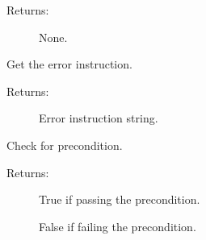 \documentclass[letterpaper,10pt,english]{sphinxmanual}
\begin{document}
\begin{fulllineitems}
\begin{fulllineitems}
\begin{description}
\item[{Returns:}] \leavevmode
\sphinxAtStartPar
None.

\end{description}

\end{fulllineitems}


\begin{fulllineitems}
\label{\detokenize{QConnectBase:QConnectBase.connection_base.ConnectionBase.error_instruction}}
\sphinxAtStartPar
Get the error instruction.
\begin{description}
\item[{Returns:}] \leavevmode
\sphinxAtStartPar
Error instruction string.

\end{description}

\end{fulllineitems}


\begin{fulllineitems}
\label{\detokenize{QConnectBase:QConnectBase.connection_base.ConnectionBase.is_precondition_pass}}
\sphinxAtStartPar
Check for precondition.
\begin{description}
\item[{Returns:}] \leavevmode
\sphinxAtStartPar
True if passing the precondition.

\sphinxAtStartPar
False if failing the precondition.

\end{description}

\end{fulllineitems}



\end{fulllineitems}
\end{document}

